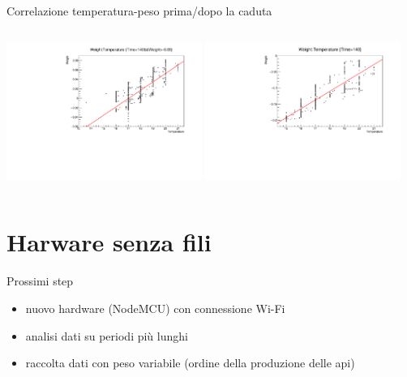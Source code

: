 \documentclass{beamer}
\begin{document}
\begin{frame}{Correlazione temperatura-peso}
  prima/dopo la caduta
  \begin{columns}[c] 
      \includegraphics[height=4.5cm]{../../analisi_dati/171010_long_sd_temp/Weight:Temperature_timed_first}
      \includegraphics[height=4.5cm]{../../analisi_dati/171010_long_sd_temp/Weight:Temperature_timed_second}
   \end{columns}
\end{frame}

\section{Harware senza fili}
\begin{frame}
  \Large{Prossimi step}
  \begin{itemize}
    \item nuovo hardware (NodeMCU) con connessione Wi-Fi
    \item analisi dati su periodi pi\`u lunghi
    \item raccolta dati con peso variabile (ordine della produzione delle api)
  \end{itemize}
\end{frame}
\end{document}
